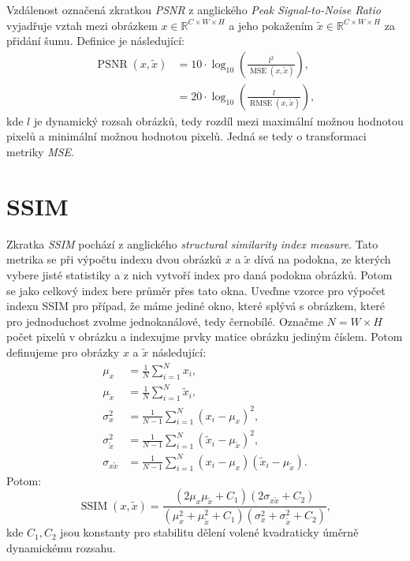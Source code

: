 \documentclass[czech]{article}
\begin{document}
Vzdálenost označená zkratkou \emph{PSNR} z anglického \emph{Peak Signal-to-Noise Ratio}
vyjadřuje vztah mezi obrázkem $x \in \mathbb{R}^{C \times W \times H}$
a jeho pokažením $\tilde{x} \in \mathbb{R}^{C \times W \times H}$ za přidání šumu.
Definice je následující:
\begin{align}
    \operatorname{PSNR}(x, \tilde{x}) &= 10 \cdot \operatorname{log}_{10} \left( \frac{l^2}{\operatorname{MSE}(x, \tilde{x})} \right), \\
    &= 20 \cdot \operatorname{log}_{10} \left( \frac{l}{\operatorname{RMSE}(x, \tilde{x})} \right),
\end{align}
kde $l$ je dynamický rozsah obrázků, tedy rozdíl mezi maximální možnou hodnotou pixelů a minimální možnou hodnotou pixelů.
Jedná se tedy o transformaci metriky \emph{MSE}.

\section{SSIM}

Zkratka \emph{SSIM} pochází z anglického \emph{structural similarity index measure}.
Tato metrika se při výpočtu indexu dvou obrázků $x$ a $\tilde{x}$ dívá na podokna,
ze kterých vybere jisté statistiky a z nich vytvoří index pro daná podokna obrázků.
Potom se jako celkový index bere průměr přes tato okna.
Uveďme vzorce pro výpočet indexu SSIM pro případ, že máme jediné okno, které splývá s obrázkem,
které pro jednoduchost zvolme jednokanálové, tedy černobílé.
Označme $N = W \times H$ počet pixelů v obrázku a indexujme prvky matice obrázku jediným číslem.
Potom definujeme pro obrázky $x$ a $\tilde{x}$ následující:
\begin{align*}
    \mu_x &= \frac{1}{N} \sum_{i = 1}^N x_i, \\
    \mu_{\tilde{x}} &= \frac{1}{N} \sum_{i = 1}^N \tilde{x}_i, \\
    \sigma_x^2 &= \frac{1}{N - 1} \sum_{i = 1}^N (x_i - \mu_x)^2, \\
    \sigma_{\tilde{x}}^2 &= \frac{1}{N - 1} \sum_{i = 1}^N (\tilde{x}_i - \mu_{\tilde{x}})^2, \\
    \sigma_{x \tilde{x}} &= \frac{1}{N - 1} \sum_{i = 1}^N (x_i - \mu_x)(\tilde{x}_i - \mu_{\tilde{x}}).
\end{align*}
Potom:
\begin{equation}
    \operatorname{SSIM}(x, \tilde{x}) = \frac{(2 \mu_x \mu_{\tilde{x}} + C_1)(2 \sigma_{x \tilde{x}} + C_2)}{(\mu_x^2 + \mu_{\tilde{x}}^2 + C_1)(\sigma_x^2 + \sigma_{\tilde{x}}^2 + C_2)},
\end{equation}
kde $C_1, C_2$ jsou konstanty pro stabilitu dělení volené kvadraticky úměrně dynamickému rozsahu.
\end{document}
